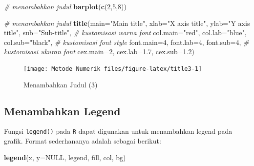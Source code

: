 \documentclass[]{book}
\newenvironment{Shaded}{\begin{snugshade}}{\end{snugshade}}
\newcommand{\CommentTok}[1]{\textcolor[rgb]{0.56,0.35,0.01}{\textit{#1}}}
\newcommand{\DataTypeTok}[1]{\textcolor[rgb]{0.13,0.29,0.53}{#1}}
\newcommand{\DecValTok}[1]{\textcolor[rgb]{0.00,0.00,0.81}{#1}}
\newcommand{\FloatTok}[1]{\textcolor[rgb]{0.00,0.00,0.81}{#1}}
\newcommand{\KeywordTok}[1]{\textcolor[rgb]{0.13,0.29,0.53}{\textbf{#1}}}
\newcommand{\NormalTok}[1]{#1}
\newcommand{\OtherTok}[1]{\textcolor[rgb]{0.56,0.35,0.01}{#1}}
\newcommand{\StringTok}[1]{\textcolor[rgb]{0.31,0.60,0.02}{#1}}
\theoremstyle{definition}
\theoremstyle{definition}
\theoremstyle{definition}
\theoremstyle{remark}
\begin{document}
\begin{Shaded}
\begin{Highlighting}[]
\CommentTok{# menambahkan judul}
\KeywordTok{barplot}\NormalTok{(}\KeywordTok{c}\NormalTok{(}\DecValTok{2}\NormalTok{,}\DecValTok{5}\NormalTok{,}\DecValTok{8}\NormalTok{))}

\CommentTok{# menambahkan judul}
\KeywordTok{title}\NormalTok{(}\DataTypeTok{main=}\StringTok{"Main title"}\NormalTok{,}
      \DataTypeTok{xlab=}\StringTok{"X axis title"}\NormalTok{,}
      \DataTypeTok{ylab=}\StringTok{"Y axis title"}\NormalTok{,}
      \DataTypeTok{sub=}\StringTok{"Sub-title"}\NormalTok{,}
      \CommentTok{# kustomisasi warna font}
      \DataTypeTok{col.main=}\StringTok{"red"}\NormalTok{, }
      \DataTypeTok{col.lab=}\StringTok{"blue"}\NormalTok{, }
      \DataTypeTok{col.sub=}\StringTok{"black"}\NormalTok{,}
      \CommentTok{# kustomisasi font style}
      \DataTypeTok{font.main=}\DecValTok{4}\NormalTok{, }
      \DataTypeTok{font.lab=}\DecValTok{4}\NormalTok{, }
      \DataTypeTok{font.sub=}\DecValTok{4}\NormalTok{,}
      \CommentTok{# kustomisasi ukuran font}
      \DataTypeTok{cex.main=}\DecValTok{2}\NormalTok{, }
      \DataTypeTok{cex.lab=}\FloatTok{1.7}\NormalTok{, }
      \DataTypeTok{cex.sub=}\FloatTok{1.2}\NormalTok{)}
\end{Highlighting}
\end{Shaded}

\begin{figure}

{\centering \texttt{[image: Metode\_Numerik\_files/figure-latex/title3-1]} 

}

\caption{Menambahkan Judul (3)}\label{fig:title3}
\end{figure}

\hypertarget{addlegend}{%
\subsection{Menambahkan Legend}\label{addlegend}}

Fungsi \texttt{legend()} pada \texttt{R} dapat digunakan untuk menambahkan legend pada grafik. Format sederhananya adalah sebagai berikut:

\begin{Shaded}
\begin{Highlighting}[]
\KeywordTok{legend}\NormalTok{(x, }\DataTypeTok{y=}\OtherTok{NULL}\NormalTok{, legend, fill, col, bg)}
\end{Highlighting}
\end{Shaded}
\end{document}

